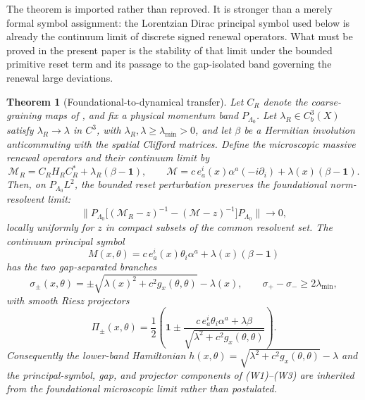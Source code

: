 \documentclass[11pt]{article}
\newtheorem{theorem}{Theorem}[section]
\theoremstyle{definition}
\theoremstyle{remark}
\begin{document}
The theorem is imported rather than reproved.  It is stronger than a merely
formal symbol assignment: the Lorentzian Dirac principal symbol used below is
already the continuum limit of discrete signed renewal operators.  What must be
proved in the present paper is the stability of that limit under the bounded
primitive reset term and its passage to the gap-isolated band governing the
renewal large deviations.

\begin{theorem}[Foundational-to-dynamical transfer]
\label{thm:foundational-transfer}
Let $C_R$ denote the coarse-graining maps of
, and fix a physical momentum band
$P_{\Lambda_0}$.  Let $\lambda_R\in C_b^3(X)$ satisfy
$\lambda_R\to\lambda$ in $C^3$, with
$\lambda_R,\lambda\ge\lambda_{\min}>0$, and let $\beta$ be a Hermitian
involution anticommuting with the spatial Clifford matrices.  Define the
microscopic massive renewal operators and their continuum limit by
\[
 \mathcal M_R=C_RH_RC_R^*+\lambda_R(\beta-\mathbf 1),
 \qquad
 \mathcal M=c\,e_a^i(x)\alpha^a(-i\partial_i)
             +\lambda(x)(\beta-\mathbf 1).
\]
Then, on $P_{\Lambda_0}L^2$, the bounded reset perturbation preserves the
foundational norm-resolvent limit:
\[
 \bigl\|P_{\Lambda_0}\bigl[(\mathcal M_R-z)^{-1}
       -(\mathcal M-z)^{-1}\bigr]P_{\Lambda_0}\bigr\|
 \longrightarrow0,
\]
locally uniformly for $z$ in compact subsets of the common resolvent set.  The
continuum principal symbol
\[
 M(x,\theta)=c\,e_a^i(x)\theta_i\alpha^a
             +\lambda(x)(\beta-\mathbf 1)
\]
has the two gap-separated branches
\[
 \sigma_\pm(x,\theta)=\pm\sqrt{\lambda(x)^2+c^2g_x(\theta,\theta)}-\lambda(x),
 \qquad
 \sigma_+-\sigma_-\ge2\lambda_{\min},
\]
with smooth Riesz projectors
\[
 \Pi_\pm(x,\theta)=\frac12\left(
 \mathbf 1\pm\frac{c\,e_a^i\theta_i\alpha^a+\lambda\beta}
 {\sqrt{\lambda^2+c^2g_x(\theta,\theta)}}\right).
\]
Consequently the lower-band Hamiltonian
$h(x,\theta)=\sqrt{\lambda^2+c^2g_x(\theta,\theta)}-\lambda$
and the principal-symbol, gap, and projector components of
\textup{(W1)--(W3)} are inherited from the foundational microscopic limit
rather than postulated.


\end{theorem}
\end{document}

